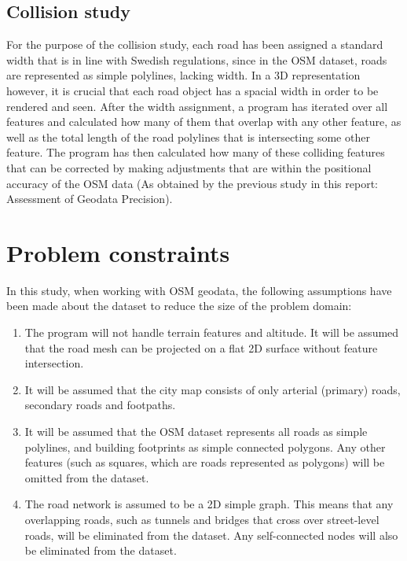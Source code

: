 \documentclass{kththesis}
\begin{document}
\subsection{Collision study}

For the purpose of the collision study, each road has been assigned a standard width that is in line with Swedish regulations, since in the OSM dataset, roads are represented as simple polylines, lacking width.
In a 3D representation however, it is crucial that each road object has a spacial width in order to be rendered and seen.
After the width assignment, a program has iterated over all features and calculated how many of them that overlap with any other feature, as well as the total length of the road polylines that is intersecting some other feature.
The program has then calculated how many of these colliding features that can be corrected by making adjustments that are within the positional accuracy of the OSM data (As obtained by the previous study in this report: Assessment of Geodata Precision).

\section{Problem constraints}

In this study, when working with OSM geodata, the following assumptions have been made about the dataset to reduce the size of the problem domain:

\begin{enumerate}
    \item The program will not handle terrain features and altitude. It will be assumed that the road mesh can be projected on a flat 2D surface without feature intersection.
    \item It will be assumed that the city map consists of only arterial (primary) roads, secondary roads and footpaths.
    \item It will be assumed that the OSM dataset represents all roads as simple polylines, and building footprints as simple connected polygons. Any other features (such as squares, which are roads represented as polygons) will be omitted from the dataset.
    \item The road network is assumed to be a 2D simple graph. This means that any overlapping roads, such as tunnels and bridges that cross over street-level roads, will be eliminated from the dataset. Any self-connected nodes will also be eliminated from the dataset.
\end{enumerate}
\end{document}

